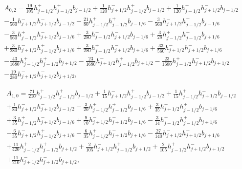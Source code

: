 \documentclass[12pt]{article}
\begin{document}
\begin{multline*} A_{0,2} = \frac{19}{105} h_{j-1/2}^+ h_{j-1/2}^+ b_{j-1/2}+\frac{1}{120} h_{j+1/2}^- h_{j-1/2}^+ b_{j-1/2}+\frac{1}{120} h_{j-1/2}^+ h_{j+1/2}^- b_{j-1/2}\\-\frac{1}{560} h_{j+1/2}^- h_{j+1/2}^- b_{j-1/2}-\frac{21}{80} h_{j-1/2}^+ h_{j-1/2}^+ b_{j-1/6}-\frac{3}{560} h_{j+1/2}^- h_{j-1/2}^+ b_{j-1/6}\\-\frac{3}{560} h_{j-1/2}^+ h_{j+1/2}^- b_{j-1/6}+\frac{3}{280} h_{j+1/2}^- h_{j+1/2}^- b_{j-1/6}+\frac{3}{28} h_{j-1/2}^+ h_{j-1/2}^+ b_{j+1/6}\\+\frac{3}{280} h_{j+1/2}^- h_{j-1/2}^+ b_{j+1/6}+\frac{3}{280} h_{j-1/2}^+ h_{j+1/2}^- b_{j+1/6}+\frac{33}{560} h_{j+1/2}^- h_{j+1/2}^- b_{j+1/6}\\-\frac{43}{1680} h_{j-1/2}^+ h_{j-1/2}^+ b_{j+1/2}-\frac{23}{1680} h_{j+1/2}^- h_{j-1/2}^+ b_{j+1/2}-\frac{23}{1680} h_{j-1/2}^+ h_{j+1/2}^- b_{j+1/2}\\-\frac{19}{280} h_{j+1/2}^- h_{j+1/2}^- b_{j+1/2}, \end{multline*}

\begin{multline*} A_{1,0} = \frac{71}{210} h_{j-1/2}^+ h_{j-1/2}^+ b_{j-1/2}+\frac{1}{15} h_{j+1/2}^- h_{j-1/2}^+ b_{j-1/2}+\frac{1}{15} h_{j-1/2}^+ h_{j+1/2}^- b_{j-1/2}\\+\frac{1}{84} h_{j+1/2}^- h_{j+1/2}^- b_{j-1/2}-\frac{3}{20} h_{j-1/2}^+ h_{j-1/2}^+ b_{j-1/6}+\frac{3}{35} h_{j+1/2}^- h_{j-1/2}^+ b_{j-1/6}\\+\frac{3}{35} h_{j-1/2}^+ h_{j+1/2}^- b_{j-1/6}+\frac{9}{70} h_{j+1/2}^- h_{j+1/2}^- b_{j-1/6}-\frac{3}{14} h_{j-1/2}^+ h_{j-1/2}^+ b_{j+1/6}\\-\frac{6}{35} h_{j+1/2}^- h_{j-1/2}^+ b_{j+1/6}-\frac{6}{35} h_{j-1/2}^+ h_{j+1/2}^- b_{j+1/6}-\frac{27}{140} h_{j+1/2}^- h_{j+1/2}^- b_{j+1/6}\\+\frac{11}{420} h_{j-1/2}^+ h_{j-1/2}^+ b_{j+1/2}+\frac{2}{105} h_{j+1/2}^- h_{j-1/2}^+ b_{j+1/2}+\frac{2}{105} h_{j-1/2}^+ h_{j+1/2}^- b_{j+1/2}\\+\frac{11}{210} h_{j+1/2}^- h_{j+1/2}^- b_{j+1/2}, \end{multline*}
\end{document}
